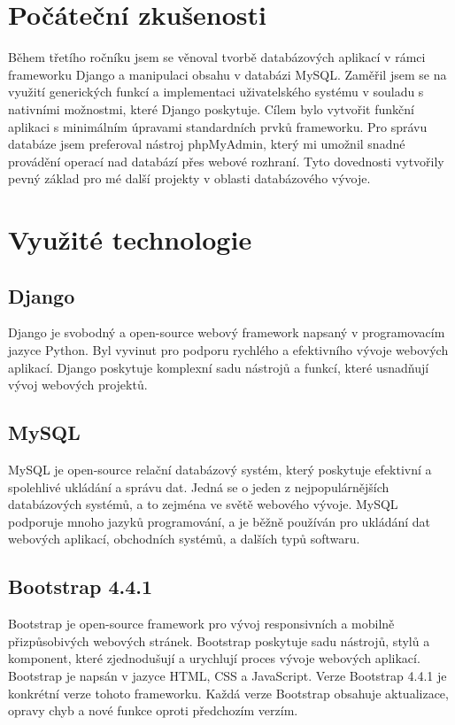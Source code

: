 \documentclass[12pt, a4paper,
twoside,        %
openright
]{report}
\begin{document}
\section[Počáteční zkušenosti]{Počáteční zkušenosti}
Během třetího ročníku jsem se věnoval tvorbě databázových aplikací v rámci frameworku Django a manipulaci obsahu v databázi MySQL. Zaměřil jsem se na využití generických funkcí a implementaci uživatelského systému v souladu s nativními možnostmi, které Django poskytuje. Cílem bylo vytvořit funkční aplikaci s minimálním úpravami standardních prvků frameworku. Pro správu databáze jsem preferoval nástroj phpMyAdmin, který mi umožnil snadné provádění operací nad databází přes webové rozhraní. Tyto dovednosti vytvořily pevný základ pro mé další projekty v oblasti databázového vývoje.
\section[Využité technologie]{Využité technologie}
	\subsection[Django]{Django} 
	Django je svobodný a open-source webový framework napsaný v programovacím jazyce Python. Byl vyvinut pro podporu rychlého a efektivního vývoje webových aplikací. Django poskytuje komplexní sadu nástrojů a funkcí, které usnadňují vývoj webových projektů.
	\subsection[MySQL]{MySQL}  
	MySQL je open-source relační databázový systém, který poskytuje efektivní a spolehlivé ukládání a správu dat. Jedná se o jeden z nejpopulárnějších databázových systémů, a to zejména ve světě webového vývoje. MySQL podporuje mnoho jazyků programování, a je běžně používán pro ukládání dat webových aplikací, obchodních systémů, a dalších typů softwaru.
	\newpage
	\subsection[Bootstrap 4.4.1]{Bootstrap 4.4.1} 
	Bootstrap je open-source framework pro vývoj responsivních a mobilně přizpůsobivých webových stránek. Bootstrap poskytuje sadu nástrojů, stylů a komponent, které zjednodušují a urychlují proces vývoje webových aplikací. Bootstrap je napsán v jazyce HTML, CSS a JavaScript. Verze Bootstrap 4.4.1 je konkrétní verze tohoto frameworku. Každá verze Bootstrap obsahuje aktualizace, opravy chyb a nové funkce oproti předchozím verzím.
\end{document}
